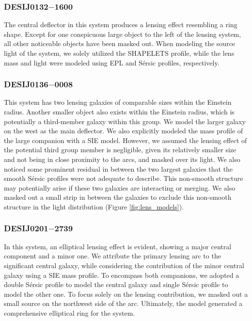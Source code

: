 \documentclass{aa}
\begin{document}
\subsubsection{DESIJ0132$-$1600}

The central deflector in this system produces a lensing effect resembling a ring shape. Except for one conspicuous large object to the left of the lensing system, all other noticeable objects have been masked out. When modeling the source light of the system, we solely utilized the SHAPELETS profile, while the lens mass and light were modeled using EPL and S\'ersic profiles, respectively.

\subsubsection{DESIJ0136$-$0008}

This system has two lensing galaxies of comparable sizes within the Einstein radius. Another smaller object also exists within the Einstein radius, which is potentially a third-member galaxy within this group. We model the larger galaxy on the west as the main deflector. We also explicitly modeled the mass profile of the large companion with a SIE model. However, we assumed the lensing effect of the potential third group member is negligible, given its relatively smaller size and not being in close proximity to the arcs, and masked over its light. We also noticed some prominent residual in between the two largest galaxies that the smooth S\'ersic profiles were not adequate to describe. This non-smooth structure may potentially arise if these two galaxies are interacting or merging. We also masked out a small strip in between the galaxies to exclude this non-smooth structure in the light distribution (Figure \ref{fig:lens_models}).

\subsubsection{DESIJ0201$-$2739}

In this system, an elliptical lensing effect is evident, showing a major central component and a minor one. We attribute the primary lensing arc to the significant central galaxy, while considering the contribution of the minor central galaxy using a SIE mass profile. To encompass both companions, we adopted a double S\'ersic  profile to model the central galaxy and single S\'ersic  profile to model the other one. To focus solely on the lensing contribution, we masked out a small source on the northwest side of the arc. Ultimately, the model generated a comprehensive elliptical ring for the system.
\end{document}

